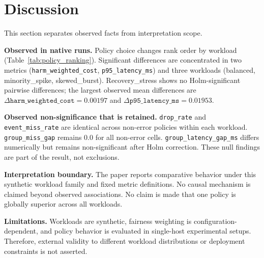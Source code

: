 \section{Discussion}
This section separates observed facts from interpretation scope.

\textbf{Observed in native runs.}
Policy choice changes rank order by workload (Table~\ref{tab:policy_ranking}).
Significant differences are concentrated in two metrics (\texttt{harm\_weighted\_cost}, \texttt{p95\_latency\_ms})
and three workloads (balanced, minority\_spike, skewed\_burst).
Recovery\_stress shows no Holm-significant pairwise differences; the largest observed mean differences are
\(\Delta\texttt{harm\_weighted\_cost}=0.00197\) and \(\Delta\texttt{p95\_latency\_ms}=0.01953\).

\textbf{Observed non-significance that is retained.}
\texttt{drop\_rate} and \texttt{event\_miss\_rate} are identical across non-error policies within each workload.
\texttt{group\_miss\_gap} remains 0.0 for all non-error cells.
\texttt{group\_latency\_gap\_ms} differs numerically but remains non-significant after Holm correction.
These null findings are part of the result, not exclusions.

\textbf{Interpretation boundary.}
The paper reports comparative behavior under this synthetic workload family and fixed metric definitions.
No causal mechanism is claimed beyond observed associations.
No claim is made that one policy is globally superior across all workloads.

\textbf{Limitations.}
Workloads are synthetic, fairness weighting is configuration-dependent, and policy behavior is evaluated in
single-host experimental setups.
Therefore, external validity to different workload distributions or deployment constraints is not asserted.
